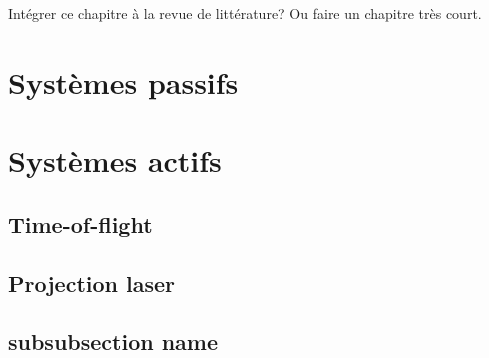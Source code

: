 \label{sec:capteurs}
\color{red}
Intégrer ce chapitre à la revue de littérature? Ou faire un chapitre très court.
\color{black}

\section{Systèmes passifs}

\section{Systèmes actifs}

\subsection{Time-of-flight}

\subsection{Projection laser}

\subsection{subsubsection name}
